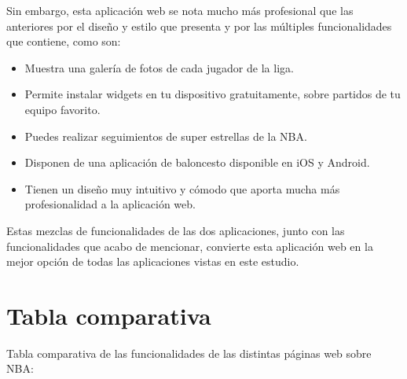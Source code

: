 Sin embargo, esta aplicación web se nota mucho más profesional que las anteriores por el diseño y estilo que presenta y por las múltiples funcionalidades que contiene, como son: 
\begin{itemize}
\tightlist
    \item Muestra una galería de fotos de cada jugador de la liga. 
    \item Permite instalar widgets en tu dispositivo gratuitamente, sobre partidos de tu equipo favorito. 
    \item Puedes realizar seguimientos de super estrellas de la NBA. 
    \item Disponen de una aplicación de baloncesto disponible en iOS y Android.
    \item Tienen un diseño muy intuitivo y cómodo que aporta mucha más profesionalidad a la aplicación web. 
\end{itemize}
\hfill
Estas mezclas de funcionalidades de las dos aplicaciones, junto con las funcionalidades que acabo de mencionar, convierte esta aplicación web en la mejor opción de todas las aplicaciones vistas en este estudio. 


\clearpage

\section{Tabla comparativa}
Tabla comparativa de las funcionalidades de las distintas páginas web sobre NBA: 


